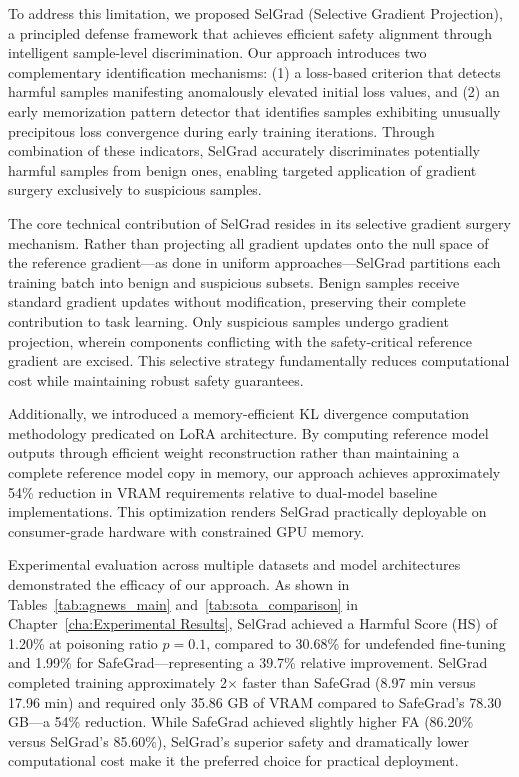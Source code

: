 To address this limitation, we proposed SelGrad (Selective Gradient Projection), a principled defense framework that achieves efficient safety alignment through intelligent sample-level discrimination. Our approach introduces two complementary identification mechanisms: (1) a loss-based criterion that detects harmful samples manifesting anomalously elevated initial loss values, and (2) an early memorization pattern detector that identifies samples exhibiting unusually precipitous loss convergence during early training iterations. Through combination of these indicators, SelGrad accurately discriminates potentially harmful samples from benign ones, enabling targeted application of gradient surgery exclusively to suspicious samples.

The core technical contribution of SelGrad resides in its selective gradient surgery mechanism. Rather than projecting all gradient updates onto the null space of the reference gradient---as done in uniform approaches---SelGrad partitions each training batch into benign and suspicious subsets. Benign samples receive standard gradient updates without modification, preserving their complete contribution to task learning. Only suspicious samples undergo gradient projection, wherein components conflicting with the safety-critical reference gradient are excised. This selective strategy fundamentally reduces computational cost while maintaining robust safety guarantees.

Additionally, we introduced a memory-efficient KL divergence computation methodology predicated on LoRA architecture. By computing reference model outputs through efficient weight reconstruction rather than maintaining a complete reference model copy in memory, our approach achieves approximately 54\% reduction in VRAM requirements relative to dual-model baseline implementations. This optimization renders SelGrad practically deployable on consumer-grade hardware with constrained GPU memory.

Experimental evaluation across multiple datasets and model architectures demonstrated the efficacy of our approach. As shown in Tables~\ref{tab:agnews_main} and~\ref{tab:sota_comparison} in Chapter~\ref{cha:Experimental Results}, SelGrad achieved a Harmful Score (HS) of 1.20\% at poisoning ratio $p=0.1$, compared to 30.68\% for undefended fine-tuning and 1.99\% for SafeGrad---representing a 39.7\% relative improvement. SelGrad completed training approximately 2$\times$ faster than SafeGrad (8.97 min versus 17.96 min) and required only 35.86 GB of VRAM compared to SafeGrad's 78.30 GB---a 54\% reduction. While SafeGrad achieved slightly higher FA (86.20\% versus SelGrad's 85.60\%), SelGrad's superior safety and dramatically lower computational cost make it the preferred choice for practical deployment.

